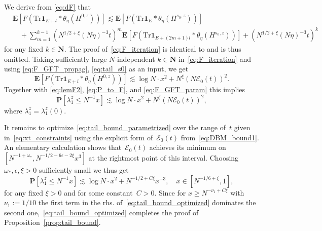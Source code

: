 \documentclass[10pt]{amsart}
\numberwithin{equation}{section}
\newcommand{\E}{\mathbf{E}}
\newcommand{\N}{\mathbf{N}}
\begin{document}
We derive from \eqref{eq:dF} that 
\begin{equation}
\begin{split}
&\E \left[ F\left(\mathrm{Tr}\bm{1}_{E+l}*\theta_\eta(H^{0,z})\right)\right]\lesssim \E \left[ F\left(\mathrm{Tr}\bm{1}_{E}*\theta_\eta(H^{s_0,z})\right)\right]\\
&\quad + \sum_{m=1}^{k-1} \left(N^{1/2+\xi}(N\eta)^{-3}t\right)^m \E \left[ F\left(\mathrm{Tr}\bm{1}_{E+(2m+1)l}*\theta_\eta(H^{s_0,z})\right)\right] + \left(N^{1/2+\xi}(N\eta)^{-3}t\right)^k
\end{split}
\label{eq:F_iteration}
\end{equation}
for any fixed $k\in \N$. The proof of~\eqref{eq:F_iteration} is identical to \cite[Eq.(3.19)--(3.20)]{LFL_Wigner} and is thus omitted. Taking sufficiently large $N$-independent $k\in\N$ in~\eqref{eq:F_iteration} and using \eqref{eq:F_GFT_propag}, \eqref{eq:tail_s0} as an input, we get
\begin{equation}
\E \left[ F\left(\mathrm{Tr}\bm{1}_{E+l}*\theta_\eta(H^{0,z})\right)\right] \lesssim \log N\cdot x^2 + N^\xi (N\mathcal{E}_0(t))^2.
\end{equation}
Together with \eqref{eq:lemF2}, \eqref{eq:P_to_F}, and \eqref{eq:F_GFT_param} this implies
\begin{equation}
\mathbf{P}\left[\lambda_1^z \le N^{-1}x\right] \lesssim \log N\cdot x^2 + N^\xi (N\mathcal{E}_0(t))^2,
\label{eq:tail_bound_parametrized}
\end{equation}
where $\lambda_1^z=\lambda_1^z(0)$.


It remains to optimize~\eqref{eq:tail_bound_parametrized} over the range of~$t$ given in~\eqref{eq:xt_constraints} using the explicit form of~$\mathcal{E}_0(t)$ from~\eqref{eq:DBM_bound1}. An elementary calculation shows that~$\mathcal{E}_0(t)$ achieves its minimum on $[N^{-1+\omega_*}, N^{-1/2-6\epsilon-2\xi}x^3]$ at the rightmost point of this interval. Choosing $\omega_*,\epsilon,\xi>0$ sufficiently small we thus get
\begin{equation}
\mathbf{P}\left[\lambda_1^z \le N^{-1}x\right] \lesssim \log N\cdot x^2 + N^{-1/2+C\xi}x^{-3},\quad x\in [N^{-1/6+\xi},1],
\label{eq:tail_bound_optimized}
\end{equation}
for any fixed $\xi>0$ and for some constant~$C>0$. Since for $x\ge N^{-\nu_1+C\xi}$ with $\nu_1:=1/10$ the first term in the rhs. of~\eqref{eq:tail_bound_optimized} dominates the second one,~\eqref{eq:tail_bound_optimized} completes the proof of Proposition~\ref{prop:tail_bound}.
\end{document}
